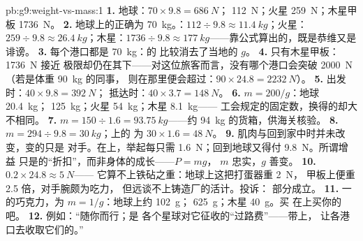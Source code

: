 \begin{solution}{pb:g9:weight-vs-mass:1}
\textbf{1.} 地球：$70 \times 9.8 = \qty{686}{N}$；
\qty{112}{N}；火星 \qty{259}{N}；木星甲板
\qty{1736}{N}。
\textbf{2.} 地球上的正确为 \qty{70}{kg}。：$112 \div
9.8 \approx \qty{11.4}{kg}$；火星：$259 \div 9.8 \approx
\qty{26.4}{kg}$；木星：$1736 \div 9.8 \approx
\qty{177}{kg}$——靠公式算出的，既是恭维又是诽谤。
\textbf{3.} 每个港口都是 \qty{70}{kg}：的
比较消去了当地的 $g$。
\textbf{4.} 只有木星甲板：\qty{1736}{N} 接近
极限却仍在其下——对这位旅客而言，没有哪个港口会突破 \qty{2000}{N}
（若是体重 \qty{90}{kg} 的同事，
则在那里便会超过：$90 \times 24.8 = \qty{2232}{N}$）。
\textbf{5.} 出发时：$40 \times 9.8 = \qty{392}{N}$；
抵达时：$40 \times 3.7 = \qty{148}{N}$。
\textbf{6.} $m = 200/g$：地球 \qty{20.4}{kg}；
\qty{125}{kg}；火星 \qty{54}{kg}；木星 \qty{8.1}{kg}——
工会规定的固定数，换得的却大不相同。
\textbf{7.} $m = 150 \div 1.6 = \qty{93.75}{kg}$——约
\qty{94}{kg} 的货箱，供海关核验。
\textbf{8.} $m = 294 \div 9.8 = \qty{30}{kg}$；上的
为 $30 \times 1.6 = \qty{48}{N}$。
\textbf{9.} 肌肉与回到家中时并未改变，变的只是
对手。在上，举起每只需
\qty{1.6}{N}；回到地球又得付 \qty{9.8}{N}。所谓增益
只是的“折扣”，而非身体的成长——$P = m g$，
$m$ 忠实，$g$ 善变。
\textbf{10.} $0.2 \times 24.8 \approx \qty{5}{N}$——
它算不上铁砧之重：地球上这把打蛋器重 \qty{2}{N}，
甲板上便重 2.5 倍，对手腕颇为吃力，
但远谈不上铸造厂的活计。投诉：
部分成立。
\textbf{11.} 一的巧克力，为 $m = 1/g$：地球上约
\qty{102}{g}； \qty{625}{g}；木星 \qty{40}{g}。买
在上买你的吧。
\textbf{12.} 例如：“随你而行；是
各个星球对它征收的“过路费”——带上，
让各港口去收取它们的。”
\end{solution}
